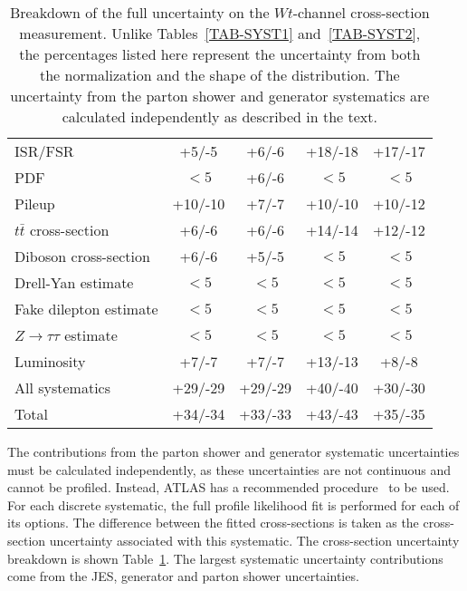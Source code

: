 \begin{table}[htdp]
\begin{center}
\begin{tabular}{l|c|c|c|c}
    ISR/FSR                           & +5/-5     & +6/-6    & +18/-18 & +17/-17 \\
    PDF                               & $<5$      & +6/-6    & $<5$    & $<5$    \\
    Pileup                            & +10/-10   & +7/-7    & +10/-10 & +10/-12 \\
    $t\bar{t}$ cross-section          & +6/-6     & +6/-6    & +14/-14 & +12/-12 \\
    Diboson cross-section             & +6/-6     & +5/-5    & $<5$    &  $<5$   \\
    Drell-Yan estimate                & $<5$      & $<5$     & $<5$    &  $<5$   \\
    Fake dilepton estimate              & $<5$      & $<5$     & $<5$    &  $<5$   \\
    $Z\to\tau\tau$ estimate           & $<5$      & $<5$     & $<5$    &  $<5$   \\
    \hline
    Luminosity                        & +7/-7   & +7/-7    & +13/-13 & +8/-8 \\
    All systematics                   & +29/-29   & +29/-29  & +40/-40 & +30/-30 \\
    \hline\hline
    Total                             & +34/-34   & +33/-33  & +43/-43 & +35/-35 \\
    \hline\hline
   \end{tabular}
 \caption{Breakdown of the full uncertainty on the \ensuremath{Wt}-channel cross-section measurement. Unlike Tables~\ref{TAB-SYST1} and~\ref{TAB-SYST2}, the percentages listed here represent the uncertainty from both the normalization and the shape of the distribution. The uncertainty from the parton shower and generator systematics are calculated independently as described in the text.}
\label{TABLE-XS-UNCERTAINTIES}
\end{center}
\end{table}

The contributions from the parton shower and generator systematic uncertainties must be calculated independently, as these uncertainties are not continuous and cannot be profiled. Instead, ATLAS has a recommended procedure~\cite{WOUTER} to be used. For each discrete systematic, the full profile likelihood fit is performed for each of its options. The difference between the fitted cross-sections is taken as the cross-section uncertainty associated with this systematic. The cross-section uncertainty breakdown is shown Table~\ref{TABLE-XS-UNCERTAINTIES}. The largest systematic uncertainty contributions come from the JES, generator and parton shower uncertainties.

